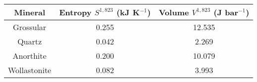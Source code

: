 \begin{center}
\begin{tabular}{|c|c|c|}
\hline
\textbf{Mineral} & \textbf{Entropy $S^{1,823}$ (kJ K$^{-1}$)} & \textbf{Volume $V^{1,823}$ (J bar$^{-1}$)} \\
\hline
Grossular   & 0.255 & 12.535 \\
\hline
Quartz      & 0.042 & 2.269 \\
\hline
Anorthite   & 0.200 & 10.079 \\
\hline
Wollastonite & 0.082 & 3.993 \\
\hline
\end{tabular}    
\end{center}


